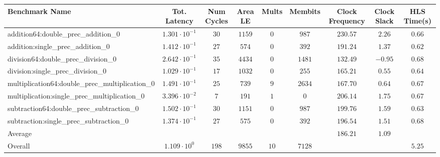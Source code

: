 \begin{tabular}{|l|c|c|c|c|c|c|c|c|}
\hline
Benchmark Name                                   & Tot. Latency            & Num Cycles & Area LE  & Mults  & Membits  & Clock Frequency & Clock Slack & HLS Time(s) \\
\hline
addition64:double\_prec\_addition\_0             & $ 1.301 \cdot 10^{-1} $ & $ 30     $ & $ 1159 $ & $ 0  $ & $ 987  $ & $ 230.57      $ & $ 2.26    $ & $ 0.66    $ \\
addition:single\_prec\_addition\_0               & $ 1.412 \cdot 10^{-1} $ & $ 27     $ & $ 574  $ & $ 0  $ & $ 392  $ & $ 191.24      $ & $ 1.37    $ & $ 0.62    $ \\
division64:double\_prec\_division\_0             & $ 2.642 \cdot 10^{-1} $ & $ 35     $ & $ 4434 $ & $ 0  $ & $ 1481 $ & $ 132.49      $ & $ -0.95   $ & $ 0.68    $ \\
division:single\_prec\_division\_0               & $ 1.029 \cdot 10^{-1} $ & $ 17     $ & $ 1032 $ & $ 0  $ & $ 255  $ & $ 165.21      $ & $ 0.55    $ & $ 0.64    $ \\
multiplication64:double\_prec\_multiplication\_0 & $ 1.491 \cdot 10^{-1} $ & $ 25     $ & $ 739  $ & $ 9  $ & $ 2634 $ & $ 167.70      $ & $ 0.64    $ & $ 0.67    $ \\
multiplication:single\_prec\_multiplication\_0   & $ 3.396 \cdot 10^{-2} $ & $ 7      $ & $ 191  $ & $ 1  $ & $ 0    $ & $ 206.14      $ & $ 1.75    $ & $ 0.67    $ \\
subtraction64:double\_prec\_subtraction\_0       & $ 1.502 \cdot 10^{-1} $ & $ 30     $ & $ 1151 $ & $ 0  $ & $ 987  $ & $ 199.76      $ & $ 1.59    $ & $ 0.63    $ \\
subtraction:single\_prec\_subtraction\_0         & $ 1.374 \cdot 10^{-1} $ & $ 27     $ & $ 575  $ & $ 0  $ & $ 392  $ & $ 196.54      $ & $ 1.51    $ & $ 0.68    $ \\
\hline
Average                                          & $                     $ & $        $ & $      $ & $    $ & $      $ & $ 186.21      $ & $ 1.09    $ & $         $ \\
\hline
Overall                                          & $ 1.109 \cdot 10^{0}  $ & $ 198    $ & $ 9855 $ & $ 10 $ & $ 7128 $ & $             $ & $         $ & $ 5.25    $ \\
\hline
\end{tabular}
